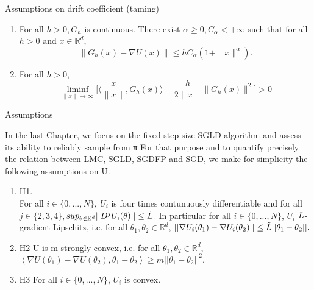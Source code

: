 \documentclass[a4paper]{article}
\theoremstyle{definition}
\newcommand{\R}{\mathbb{R}}
\begin{document}
Assumptions on drift coefficient (taming)
\begin{enumerate}[label={\bf A{\arabic*}}]
	\item  For all \(h>0, G_h\) is continuous. There exist \(\alpha\geq 0, C_{\alpha}<+\infty\) such that for all \(h >0 \) and \(x \in \R^d\),
	\[\|G_h(x)-\nabla U(x)\| \leq hC_{\alpha}(1+\|x\|^{\alpha}).\]
	\item For all \(h>0\),
	\[ \liminf_{\|x\|\to \infty} \bigg\lbrack \bigg\langle \frac{x}{\|x\|}, G_h(x)\bigg\rangle - \frac{h}{2\|x\|}\|G_h(x)\|^2\bigg\rbrack >0\]
\end{enumerate}

Assumptions

In the last Chapter, we focus on the fixed
step-size SGLD algorithm and assess its ability to reliably sample from π
For that purpose and to quantify precisely the relation between LMC, SGLD, SGDFP and SGD, we make for simplicity the
following assumptions on U. \cite{pitfalls}
\begin{enumerate}
    \item H1.\\
    For all $i \in \{0,...,N\}, \ U_i$ is four times contunuously differentiable and for all $j \in \{2, 3, 4\},$$sup_{\theta \in \mathbb{R}^d}||D^j U_i(\theta)||\leq \Tilde{L}.$ In particular for all $i\in \{0, ..., N\}$, $U_i$ $\Tilde{L}$-gradient Lipschitz, i.e. for all $\theta_1, \theta_2\in \mathbb{R}^d$, $||\nabla U_i(\theta_1) - \nabla U_i (\theta_2)|| \leq \Tilde{L}||\theta_1 - \theta_2||.$
    \item H2
    U is m-strongly convex, i.e. for all $\theta_1, \theta_2 \in \mathbb{R}^d$,$\left< \nabla U(\theta_1) - \nabla U(\theta_2), \theta_1 - \theta_2\right>\geq m ||\theta_1 - \theta_2||^2.$
    \item H3
    For all $i\in\{0,...,N\}$, $U_i$ is convex.
\end{enumerate}
\end{document}
